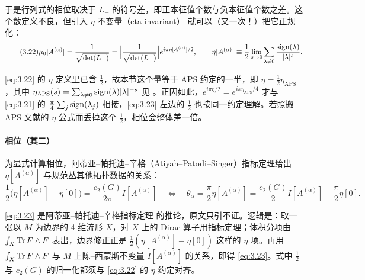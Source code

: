 于是行列式的相位取决于 $L_-$ 的符号差，即正本征值个数与负本征值个数之差。这个数定义不良，但引入 $\eta$ 不变量（eta invariant）\cite{aps1975,aps1976a,aps1976b} 就可以（又一次！）把它正规化：
\begin{equation}\tag{3.22}\label{eq:3.22}
  \mu_0[A^{(\alpha)}] = \frac{1}{\sqrt{\det(L_-)}}
  = \Bigl|\frac{1}{\sqrt{\det(L_-)}}\Bigr|e^{i\pi\eta[A^{(\alpha)}]/2},
  \qquad
  \eta[A^{(\alpha)}] \equiv \frac{1}{2}\lim_{s\to0}\sum_{\lambda\neq0}\frac{\operatorname{sign}(\lambda)}{|\lambda|^s}.
\end{equation}

\begin{yizhu}[易错点]
\eqref{eq:3.22} 的 $\eta$ 定义里已含 $\frac12$，故本节这个量等于 APS 约定的一半，即 $\eta=\frac12\eta_{\mathrm{APS}}$，其中 $\eta_{\text{APS}}(s)=\sum_{\lambda\neq0}\operatorname{sign}(\lambda)|\lambda|^{-s}$ 见 \cite{aps1975}。正因如此，$e^{i\pi\eta/2}=e^{i\pi\eta_{\text{APS}}/4}$ 才与 \eqref{eq:3.21} 的 $\frac{\pi}{4}\sum_j\operatorname{sign}(\lambda_j)$ 相接，\eqref{eq:3.23} 左边的 $\frac12$ 也按同一约定理解。若照搬 APS 文献的 $\eta$ 公式而丢掉这个 $\frac12$，相位会整体差一倍。
\end{yizhu}

\paragraph{相位（其二）}
为显式计算相位，阿蒂亚--帕托迪--辛格（Atiyah--Patodi--Singer）指标定理给出 $\eta[A^{(\alpha)}]$ 与规范丛其他拓扑数据的关系：
\begin{equation}\tag{3.23}\label{eq:3.23}
  \frac{1}{2}\bigl(\eta[A^{(\alpha)}] - \eta[0]\bigr) = \frac{c_2(G)}{2\pi}I[A^{(\alpha)}]
  \quad\Longleftrightarrow\quad
  \theta_\alpha = \frac{\pi}{2}\eta[A^{(\alpha)}] = \frac{c_2(G)}{2}I[A^{(\alpha)}] + \frac{\pi}{2}\eta[0].
\end{equation}

\begin{yizhu}[含糊点]
\eqref{eq:3.23} 是阿蒂亚--帕托迪--辛格指标定理 \cite{aps1975,aps1976a,aps1976b} 的推论，原文只引不证。逻辑是：取一张以 $M$ 为边界的 4 维流形 $X$，对 $X$ 上的 Dirac 算子用指标定理；体积分项由 $\int_X\operatorname{Tr} F\wedge F$ 表出，边界修正正是 $\frac12(\eta[A^{(\alpha)}]-\eta[0])$ 这样的 $\eta$ 项。再用 $\int_X\operatorname{Tr} F\wedge F$ 与 $M$ 上陈--西蒙斯不变量 $I[A^{(\alpha)}]$ 的关系，即得 \eqref{eq:3.23}。式中 $\frac12$ 与 $c_2(G)$ 的归一化都须与 \eqref{eq:3.22} 的 $\eta$ 约定对齐。
\end{yizhu}

